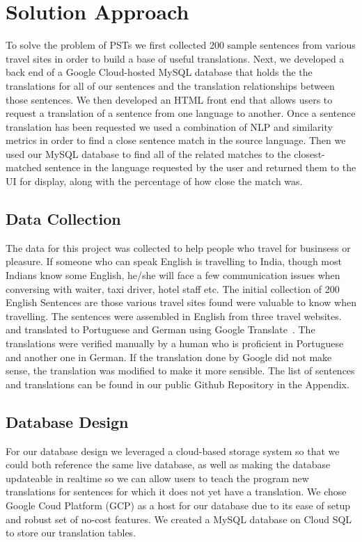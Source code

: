 \documentclass[runningheads]{llncs}
\begin{document}
	\section{Solution Approach}
	To solve the problem of PSTs we first collected 200 sample sentences from various travel sites in order to build a base of useful translations. Next, we developed a back end of a Google Cloud-hosted MySQL database that holds the the translations for all of our sentences and the translation relationships between those sentences. We then developed an HTML front end that allows users to request a translation of a sentence from one language to another. Once a sentence translation has been requested we used a combination of NLP and similarity metrics in order to find a close sentence match in the source language. Then we used our MySQL database to find all of the related matches to the closest-matched sentence in the language requested by the user and returned them to the UI for display, along with the percentage of how close the match was. 

	\subsection{Data Collection}
	The data for this project was collected to help people who travel for businsess or pleasure.  If someone who can speak English is travelling to India, though most Indians know some English, he/she will face a few communication issues when conversing with waiter, taxi driver, hotel staff etc. The initial collection of 200 English Sentences are those various travel sites found were valuable to know when travelling. The sentences were assembled in English from three travel websites.~\cite{ref_url11,ref_url12,ref_url13} and translated to Portuguese and German using Google Translate~\cite{ref_url14}. The translations were verified manually by a human who is proficient in Portuguese and another one in German. If the translation done by Google did not make sense, the translation was modified to make it more sensible. The list of sentences and translations can be found in our public Github Repository in the Appendix.
	

	\subsection{Database Design}
	For our database design we leveraged a cloud-based storage system so that we could both reference the same live database, as well as making the database updateable in realtime so we can allow users to teach the program new translations for sentences for which it does not yet have a translation. We chose Google Coud Platform (GCP) as a host for our database due to its ease of setup and robust set of no-cost features. We created a MySQL database on Cloud SQL to store our translation tables.
	
\end{document}
